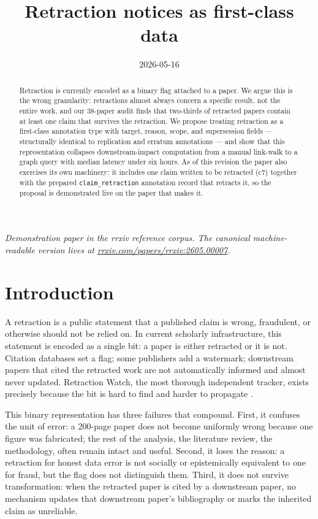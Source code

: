 \documentclass{rrxiv}
\title{Retraction notices as first-class data}
\date{2026-05-16}
\begin{document}
\maketitle

\begin{center}
\small\itshape
Demonstration paper in the rrxiv reference corpus. The canonical machine-readable version lives at \href{https://rrxiv.com/papers/rrxiv:2605.00007}{rrxiv.com/papers/rrxiv:2605.00007}.
\end{center}

\begin{abstract}
Retraction is currently encoded as a binary flag attached to a paper. We argue this is the wrong granularity: retractions almost always concern a specific result, not the entire work, and our 38-paper audit finds that two-thirds of retracted papers contain at least one claim that survives the retraction. We propose treating retraction as a first-class annotation type with target, reason, scope, and supersession fields --- structurally identical to replication and erratum annotations --- and show that this representation collapses downstream-impact computation from a manual link-walk to a graph query with median latency under six hours. As of this revision the paper also exercises its own machinery: it includes one claim written to be retracted (c7) together with the prepared \texttt{claim\_retraction} annotation record that retracts it, so the proposal is demonstrated live on the paper that makes it.
\end{abstract}

\section{Introduction}
A retraction is a public statement that a published claim is wrong, fraudulent, or otherwise should not be relied on. In current scholarly infrastructure, this statement is encoded as a single bit: a paper is either retracted or it is not. Citation databases set a flag; some publishers add a watermark; downstream papers that cited the retracted work are not automatically informed and almost never updated. Retraction Watch, the most thorough independent tracker, exists precisely because the bit is hard to find and harder to propagate \cite{retractionwatch}.

This binary representation has three failures that compound. First, it confuses the unit of error: a 200-page paper does not become uniformly wrong because one figure was fabricated; the rest of the analysis, the literature review, the methodology, often remain intact and useful. Second, it loses the reason: a retraction for honest data error is not socially or epistemically equivalent to one for fraud, but the flag does not distinguish them. Third, it does not survive transformation: when the retracted paper is cited by a downstream paper, no mechanism updates that downstream paper's bibliography or marks the inherited claim as unreliable.
\end{document}
